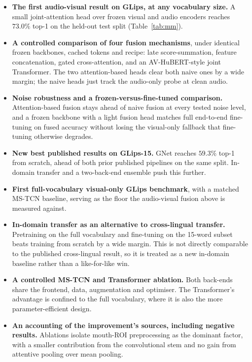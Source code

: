 \documentclass[10pt, a4paper]{article}
\begin{document}
\begin{itemize}[leftmargin=1.4em, itemsep=2pt]
    \item \textbf{The first audio-visual result on GLips, at any vocabulary size.} A small joint-attention head over frozen visual and audio encoders reaches $73.0\%$ top-1 on the held-out test split (Table~\ref{tab:mm}).
    \item \textbf{A controlled comparison of four fusion mechanisms}, under identical frozen backbones, cached tokens and recipe: late score-summation, feature concatenation, gated cross-attention, and an AV-HuBERT-style \citep{shi2022avhubert} joint Transformer. The two attention-based heads clear both naive ones by a wide margin; the naive heads just track the audio-only probe at clean audio.
    \item \textbf{Noise robustness and a frozen-versus-fine-tuned comparison.} Attention-based fusion stays ahead of naive fusion at every tested noise level, and a frozen backbone with a light fusion head matches full end-to-end fine-tuning on fused accuracy without losing the visual-only fallback that fine-tuning otherwise degrades.
    \item \textbf{New best published results on GLips-15.} GNet reaches $59.3\%$ top-1 from scratch, ahead of both prior published pipelines on the same split. In-domain transfer and a two-back-end ensemble push this further.
    \item \textbf{First full-vocabulary visual-only GLips benchmark}, with a matched MS-TCN baseline, serving as the floor the audio-visual fusion above is measured against.
    \item \textbf{In-domain transfer as an alternative to cross-lingual transfer.} Pretraining on the full vocabulary and fine-tuning on the 15-word subset beats training from scratch by a wide margin. This is not directly comparable to the published cross-lingual result, so it is treated as a new in-domain baseline rather than a like-for-like win.
    \item \textbf{A controlled MS-TCN and Transformer ablation.} Both back-ends share the frontend, data, augmentation and optimiser. The Transformer's advantage is confined to the full vocabulary, where it is also the more parameter-efficient design.
    \item \textbf{An accounting of the improvement's sources, including negative results.} Ablations isolate mouth-ROI preprocessing as the dominant factor, with a smaller contribution from the convolutional stem and no gain from attentive pooling over mean pooling.
\end{itemize}
\end{document}

